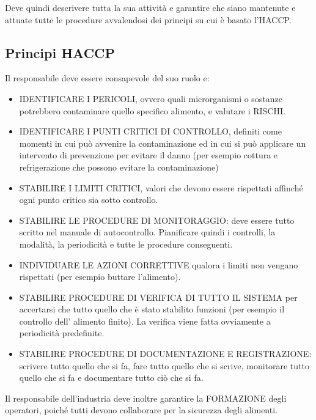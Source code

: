 Deve quindi descrivere tutta la sua attività e garantire che siano
mantenute e attuate tutte le procedure avvalendosi dei principi su cui è
basato l'HACCP.

\subsection{Principi HACCP}

Il responsabile deve essere consapevole del suo ruolo e:

\begin{itemize}
\item
  IDENTIFICARE I PERICOLI, ovvero quali microrganismi o sostanze
  potrebbero contaminare quello specifico alimento, e valutare i RISCHI.
\item
  IDENTIFICARE I PUNTI CRITICI DI CONTROLLO, definiti come momenti in
  cui può avvenire la contaminazione ed in cui si può applicare un
  intervento di prevenzione per evitare il danno (per esempio cottura e
  refrigerazione che possono evitare la contaminazione)
\item
  STABILIRE I LIMITI CRITICI, valori che devono essere rispettati
  affinché ogni punto critico sia sotto controllo.
\item
  STABILIRE LE PROCEDURE DI MONITORAGGIO: deve essere tutto scritto nel
  manuale di autocontrollo. Pianificare quindi i controlli, la modalità,
  la periodicità e tutte le procedure conseguenti.
\item
  INDIVIDUARE LE AZIONI CORRETTIVE qualora i limiti non vengano
  rispettati (per esempio buttare l'alimento).
\item
  STABILIRE PROCEDURE DI VERIFICA DI TUTTO IL SISTEMA per accertarsi che
  tutto quello che è stato stabilito funzioni (per esempio il controllo
  dell' alimento finito). La verifica viene fatta ovviamente a
  periodicità predefinite.
\item
  STABILIRE PROCEDURE DI DOCUMENTAZIONE E REGISTRAZIONE: scrivere tutto
  quello che si fa, fare tutto quello che si scrive, monitorare tutto
  quello che si fa e documentare tutto ciò che si fa.
\end{itemize}

Il responsabile dell'industria deve inoltre garantire la FORMAZIONE
degli operatori, poiché tutti devono collaborare per la sicurezza degli
alimenti.

